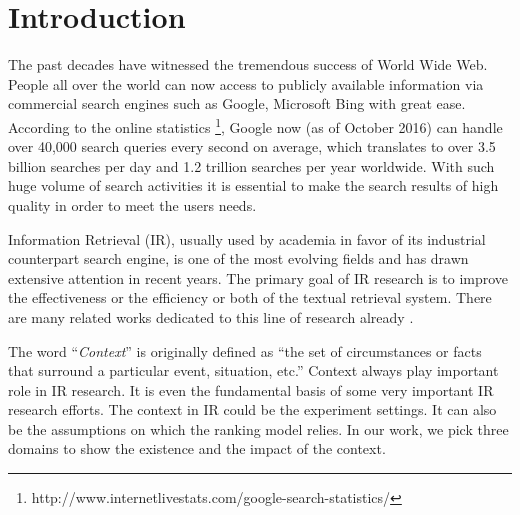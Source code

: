 %
%
\chapter{Introduction}
The past decades have witnessed the tremendous success of World Wide Web. 
People all over the world can now access to publicly available 
information via commercial search engines such as Google, Microsoft Bing 
with great ease. According to the online statistics 
\footnote{http://www.internetlivestats.com/google-search-statistics/}, 
Google now (as of October 2016) can handle over 40,000 search queries 
every second on average, which translates to over 3.5 billion searches 
per day and 1.2 trillion searches per year worldwide. 
With such huge volume of search activities it is essential to make the 
search results of high quality in order to meet the users needs.

Information Retrieval (IR), usually used by academia in favor of its 
industrial counterpart search engine, is one of the most evolving fields 
and has drawn extensive attention in recent years.
The primary goal of IR research is to improve the effectiveness or the 
efficiency or both of the textual retrieval system. 
There are many related works dedicated to this line of research already
\cite{Robertson96okapiat3,Singhal:1996:PDL:243199.243206,Zhai:2004:SSM:984321.984322,Fang:2005:EAA:1076034.1076116,Wu:2013:IAE:2484028.2484051,Liu2015}. 

The word ``\textit{Context}'' is originally defined as 
``the set of circumstances or facts that surround a particular event, situation, etc.''
Context always play important role in IR research. It is even the 
fundamental basis of some very important IR research efforts. 
The context in IR could be the experiment settings. 
It can also be the assumptions on which the ranking model relies. 
In our work, we pick three domains to show the existence and the impact of the context.

